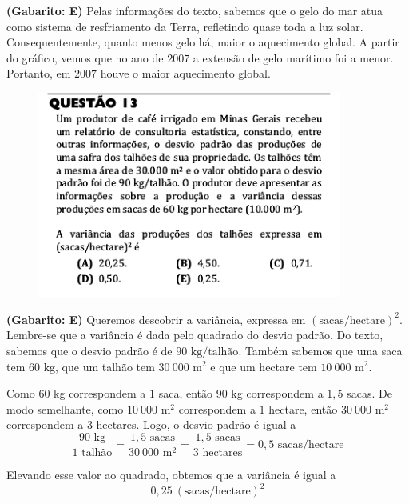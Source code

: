 \documentclass[a4paper]{article}
\begin{document}
\par\textbf{(Gabarito: E)} Pelas informações do texto, sabemos que o gelo do mar atua como sistema de resfriamento da Terra, refletindo quase toda a luz solar. Consequentemente, quanto menos gelo há, maior o aquecimento global. A partir do gráfico, vemos que no ano de $2007$ a extensão de gelo marítimo foi a menor. Portanto, em $2007$ houve o maior aquecimento global.
\begin{figure}[H]
	\begin{center}
		\includegraphics[width=10cm]{L1Q13.png}
	\end{center}
\end{figure}
\par\textbf{(Gabarito: E)} Queremos descobrir a variância, expressa em $(\text{sacas}/\text{hectare})^2$. Lembre-se que a variância é dada pelo quadrado do desvio padrão. Do texto, sabemos que o desvio padrão é de $90\text{ kg}/\text{talhão}$. Também sabemos que uma saca tem $60$ kg, que um talhão tem $30\ 000$ m$^2$ e que um hectare tem $10\ 000$ m$^2$. 
\par\vspace{0.3cm} Como $60$ kg correspondem a $1$ saca, então $90$ kg correspondem a $1,5$ sacas. De modo semelhante, como $10\ 000$ m$^2$ correspondem a $1$ hectare, então $30\ 000$ m$^2$ correspondem a $3$ hectares. Logo, o desvio padrão é igual a
\begin{equation*}
\frac{90\text{ kg}}{1\text{ talhão}} = \frac{1,5\text{ sacas}}{30\ 000\text{ m}^2} = \frac{1,5\text{ sacas}}{3\text{ hectares}} = 0,5\text{ sacas}/\text{hectare}
\end{equation*} 
\par\vspace{0.3cm} Elevando esse valor ao quadrado, obtemos que a variância é igual a
\begin{equation*}
0,25\ (\text{sacas}/\text{hectare})^2
\end{equation*}
\end{document}
